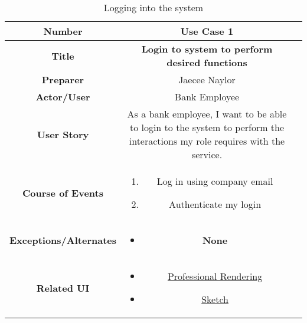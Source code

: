 \begin{table}[H]
    \centering
    \begin{tabularx}{0.75\linewidth}{||Sc|X||}
        \hline
        \hline
        \textbf{Number} & \textbf{Use Case 1} \\
        \hline
        \textbf{Title} & \textbf{Login to system to perform desired functions} \\
        \hline
        \textbf{Preparer} & Jaecee Naylor \\
        \hline
        \textbf{Actor/User} & Bank Employee \\
        \hline
        \textbf{User Story} &
        As a bank employee, I want to be able to login to the system to perform the interactions my role requires with the service. \\
        \hline
        \textbf{Course of Events} &
        \begin{minipage}[l]{\linewidth}
            \begin{enumerate}[wide, labelindent=0pt]
                \item Log in using company email
                \item Authenticate my login
            \end{enumerate}
            \vspace{4pt}
        \end{minipage} \\
        \hline
        \textbf{Exceptions/Alternates} & 
        \begin{minipage}[l]{\linewidth}
            \vspace{2pt}
            \begin{itemize}[wide, labelindent=0pt]
                \item \textbf{None}
            \end{itemize}
        \end{minipage} \\
        \hline
        \textbf{Related UI} & 
        \begin{minipage}[l]{\linewidth}
            \begin{itemize}[wide, labelindent=0pt]
                \item \href{fig:ui_1_pro}{Professional Rendering}
                \item \href{fig:ui_1_sketch}{Sketch}
            \end{itemize}
        \end{minipage} \\
        \hline
        \hline
    \end{tabularx}
    \caption{Logging into the system}
    \label{tab:use_case_login}
\end{table}

